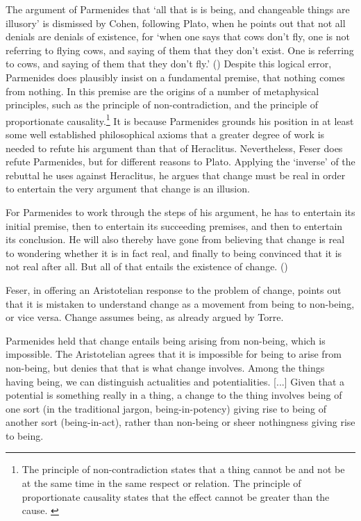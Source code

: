 The argument of Parmenides that `all that is is being, and changeable things are illusory' is dismissed by Cohen, following Plato, when he points out that not all denials are denials of existence, for `when one says that cows don't fly, one is not referring to flying cows, and saying of them that they don't exist. One is referring to cows, and saying of them that they don't fly.' (\citeyear[][]{cohen-parm1}) Despite this logical error, Parmenides does plausibly insist on a fundamental premise, that nothing comes from nothing. In this premise  are the origins of a number of metaphysical principles, such as the principle of non-contradiction, and the principle of proportionate causality.\footnote{The principle of non-contradiction states that a thing cannot be and not be at the same time in the same respect or relation. The principle of proportionate causality states that the effect cannot be greater than the cause. \parencite[][31]{wuellner2011summary}}
It is because Parmenides grounds his position in at least some well established philosophical axioms that a greater degree of work is needed to refute his argument than that of Heraclitus. Nevertheless, Feser does refute Parmenides, but for different reasons to Plato. Applying the `inverse' of the rebuttal he uses against Heraclitus, he argues that change must be real in order to entertain the very argument that change is an illusion.
\begin{quoting}
For Parmenides to work through the steps of his argument, he has to entertain its initial premise, then to entertain its succeeding premises, and then to entertain its conclusion. He will also thereby have gone from believing that change is real to wondering whether it is in fact real, and finally to being convinced that it is not real after all. But all of that entails the existence of change. (\citeyear[][14--15]{feser2019aristotle})
\end{quoting}
Feser, in offering an Aristotelian response to the problem of change, points out that it is mistaken to understand change as a movement from being to non-being, or vice versa. Change assumes being, as already argued by Torre.
\begin{quoting}
Parmenides held that change entails being arising from non-being, which is impossible. The Aristotelian agrees that it is impossible for being to arise from non-being, but denies that that is what change involves. Among the things having being, we can distinguish actualities and potentialities. [...] Given that a potential is something really in a thing, a change to the thing involves being of one sort (in the traditional jargon, being-in-potency) giving rise to being of another sort (being-in-act), rather than non-being or sheer nothingness giving rise to being. \parencite[][15]{feser2019aristotle}
\end{quoting}


